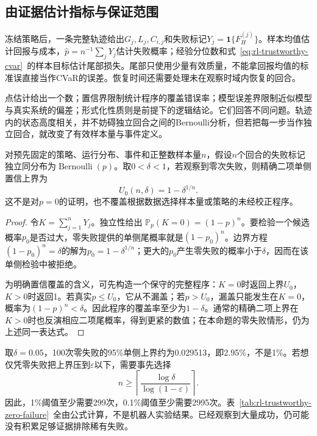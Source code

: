 \subsection{由证据估计指标与保证范围}
\label{sec:rl-trustworthy-inference}

冻结策略后，一条完整轨迹给出$G_j,L_j,C_{i,j}$和失败标记$Y_j=\mathbf1\{F_H^{(j)}\}$。样本均值估计回报与成本，$\widehat p=n^{-1}\sum_jY_j$估计失败概率；经验分位数和式~\eqref{eq:rl-trustworthy-cvar}~的样本目标估计尾部损失。尾部只使用少量有效质量，不能拿回报均值的标准误直接当作CVaR的误差。恢复时间还需要处理未在观察时域内恢复的回合。

点估计给出一个数；置信界限制统计程序的覆盖错误率；模型误差界限制近似模型与真实系统的偏差；形式化性质则是前提下的逻辑结论。它们回答不同问题。轨迹内的状态高度相关，并不妨碍独立回合之间的Bernoulli分析，但若把每一步当作独立回合，就改变了有效样本量与事件定义。

\begin{theorem}[零失败记录的单侧上界]
  \label{thm:rl-trustworthy-zero-failure}
  对预先固定的策略、运行分布、事件和正整数样本量$n$，假设$n$个回合的失败标记独立同分布为$\operatorname{Bernoulli}(p)$。取$0<\delta<1$，若观察到零次失败，则精确二项单侧置信上界为
  \[
    U_0(n,\delta)=1-\delta^{1/n}.
  \]
  这不是对$p=0$的证明，也不覆盖根据数据选择样本量或策略的未经校正程序。
\end{theorem}
\begin{proof}
  令$K=\sum_{j=1}^nY_j$。独立性给出
  $\mathbb P_p(K=0)=(1-p)^n$。要检验一个候选概率$p_0$是否过大，零失败提供的单侧尾概率就是$(1-p_0)^n$。边界方程
  $(1-p_0)^n=\delta$的解为$p_0=1-\delta^{1/n}$；更大的$p_0$产生零失败的概率小于$\delta$，因而在该单侧检验中被拒绝。

  为明确置信覆盖的含义，可先构造一个保守的完整程序：$K=0$时返回上界$U_0$，$K>0$时返回1。若真实$p\leq U_0$，它从不漏盖；若$p>U_0$，漏盖只能发生在$K=0$，概率为$(1-p)^n<\delta$。因此程序的覆盖率至少为$1-\delta$。通常的精确二项上界在$K>0$时也反演相应二项尾概率，得到更紧的数值；在本命题的零失败情形，仍为上述同一表达式。
\end{proof}

取$\delta=0.05$，100次零失败的95\%单侧上界约为0.029513，即2.95\%，不是1\%。若想仅凭零失败把上界压到$\varepsilon$以下，需要事先选择
\[
  n\geq
  \left\lceil\frac{\log\delta}{\log(1-\varepsilon)}\right\rceil.
\]
因此，1\%阈值至少需要299次，0.1\%阈值至少需要2995次。表~\ref{tab:rl-trustworthy-zero-failure}~全由公式计算，不是机器人实验结果。已经观察到大量成功，仍可能没有积累足够证据排除稀有失败。


